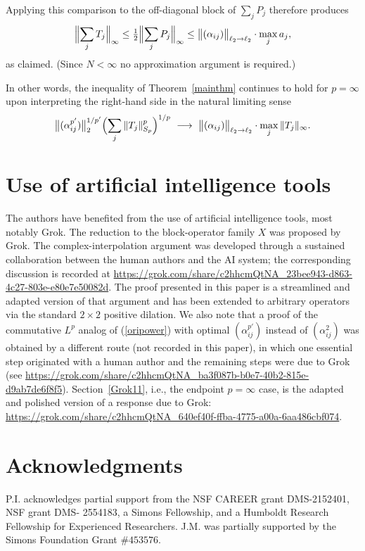 \documentclass[11pt]{article}
\theoremstyle{definition}
\newcommand{\1}{\mathbf{1}}
\begin{document}
 Applying this comparison to the off-diagonal block of \(\sum_j P_j\) therefore produces
\[
\Bigl\|\sum_j T_j\Bigr\|_\infty\le\tfrac12\Bigl\|\sum_j P_j\Bigr\|_\infty\le\bigl\|(\alpha_{ij})\bigr\|_{\ell_2\to\ell_2}\cdot\max_j a_j,
\]
as claimed. (Since \(N<\infty\) no approximation argument is required.)

In other words, the inequality of Theorem~\ref{mainthm} continues to hold for \(p=\infty\) upon interpreting the right-hand side in the natural limiting sense
\[
\bigl\|(\alpha_{ij}^{p'})\bigr\|_2^{1/p'}\Bigl(\sum_j\|T_j\|_{S_p}^p\Bigr)^{1/p}\ \longrightarrow\ \bigl\|(\alpha_{ij})\bigr\|_{\ell_2\to\ell_2}\cdot\max_j\|T_j\|_\infty.
\]

\section*{Use of artificial intelligence tools}

The authors have benefited from the use of artificial intelligence tools, most notably Grok. The reduction to the block-operator family \(X\) was proposed by Grok. The complex-interpolation argument was developed through a sustained collaboration between the human authors and the AI system; the corresponding discussion is recorded at
\url{https://grok.com/share/c2hhcmQtNA_23bee943-d863-4c27-803e-e80e7e50082d}. The proof presented in this paper is a streamlined and adapted version of that argument and has been extended to arbitrary operators via the standard \(2\times 2\) positive dilation. We also note that a proof of the commutative \(L^p\) analog of (\ref{oripower}) with optimal $(\alpha_{ij}^{p'})$ instead of $(\alpha_{ij}^{2})$  was obtained by a different route (not recorded in this paper), in which one essential step originated with a human author and the remaining steps were due to Grok (see
\url{https://grok.com/share/c2hhcmQtNA_ba3f087b-b0e7-40b2-815e-d9ab7de6f8f5}). Section~\ref{Grok11}, i.e., the endpoint $p=\infty$ case,  is the adapted and polished version of a response due to Grok:  \url{https://grok.com/share/c2hhcmQtNA_640ef40f-ffba-4775-a00a-6aa486cbf074}.

\section*{Acknowledgments}

P.I. acknowledges partial support from the NSF CAREER grant DMS-2152401, NSF grant DMS- 2554183, a Simons Fellowship, and a Humboldt Research Fellowship for Experienced Researchers. J.M. was partially supported by the Simons Foundation Grant $\# 453576$. 
\end{document}
